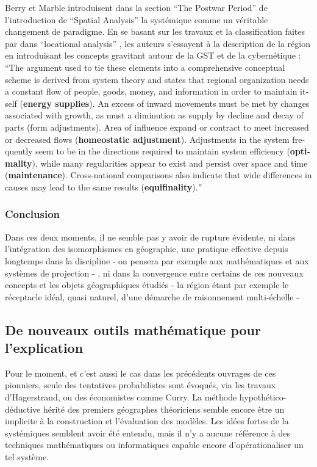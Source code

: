 Berry et Marble introduisent dans la section \foreignquote{english}{The Postwar Period} de l'introduction de \foreignquote{english}{Spatial Analysis} la systémique comme un véritable changement de paradigme. En se basant sur les travaux et la classification faites par \textcite{Haggett1965} dans \foreignquote{english}{locational analysis} , les auteurs s'essayent à la description de la région en introduisant les concepts gravitant autour de la GST et de la cybernétique : \foreignquote{english}{The argument used to tie these elements into a comprehensive conceptual scheme is derived from system theory and states that regional organization needs a constant flow of people, goods, money, and information in order to maintain itself (\textbf{energy supplies}). An excess of inward movements must be met by changes associated with growth, as must a diminution as supply by decline and decay of parts (form adjustments). Area of influence expand or contract to meet increased or decreased flows (\textbf{homeostatic adjustment}). Adjustments in the system frequently seem to be in the directions required to maintain system efficiency (\textbf{optimality}), while many regularities appear to exist and persist over space and time (\textbf{maintenance}). Cross-national comparisons also indicate that wide differences in causes may lead to the same results (\textbf{equifinality}).}



\subsubsection{Conclusion}
Dans ces deux moments, il ne semble pas y avoir de rupture évidente, ni dans l'intégration des isomorphismes en géographie, une pratique effective depuis longtemps dans la discipline - on pensera par exemple aux mathématiques et aux systèmes de projection - , ni dans la convergence entre certains de ces nouveaux concepts et les objets géographiques étudiés - la région étant par exemple le réceptacle idéal, quasi naturel, d'une démarche de raisonnement multi-échelle -

\subsection{De nouveaux outils mathématique pour l'explication}

Pour le moment, et c'est aussi le cas dans les précédents ouvrages de ces pionniers, seule des tentatives probabilistes sont évoqués, via les travaux d'Hagerstrand, ou des économistes comme Curry. La méthode hypothético-déductive hérité des premiers géographes théoriciens semble encore être un implicite à la construction et l'évaluation des modèles. Les idées fortes de la systémiques semblent avoir été entendu, mais il n'y a aucune référence à des techniques mathématiques ou informatiques capable encore d'opérationaliser un tel système. \autocite[467-468]{Harvey1969}

